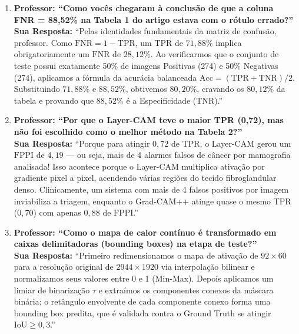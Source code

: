 \documentclass[11pt,a4paper]{article}
\begin{document}
\begin{tcolorbox}[colback=qabg, colframe=qaborder, boxrule=1pt, arc=4pt, title={\bfseries Preparação para Arguição — Parte 3 (Marcos)}]
\begin{enumerate}[leftmargin=*, itemsep=6pt]
    \item \textbf{Professor: ``Como vocês chegaram à conclusão de que a coluna FNR = 88,52\% na Tabela 1 do artigo estava com o rótulo errado?''}\\
    \textbf{Sua Resposta:} ``Pelas identidades fundamentais da matriz de confusão, professor. Como $\text{FNR} = 1 - \text{TPR}$, um $\text{TPR}$ de $71{,}88\%$ implica obrigatoriamente um $\text{FNR}$ de $28{,}12\%$. Ao verificarmos que o conjunto de teste possui exatamente 50\% de imagens Positivas (274) e 50\% Negativas (274), aplicamos a fórmula da acurácia balanceada $\text{Acc} = (\text{TPR} + \text{TNR})/2$. Substituindo $71{,}88\%$ e $88{,}52\%$, obtivemos $80{,}20\%$, cravando os $80{,}12\%$ da tabela e provando que $88{,}52\%$ é a Especificidade (TNR).''

    \item \textbf{Professor: ``Por que o Layer-CAM teve o maior TPR (0,72), mas não foi escolhido como o melhor método na Tabela 2?''}\\
    \textbf{Sua Resposta:} ``Porque para atingir $0{,}72$ de TPR, o Layer-CAM gerou um $\text{FPPI}$ de $4{,}19$ — ou seja, mais de 4 alarmes falsos de câncer por mamografia analisada! Isso acontece porque o Layer-CAM multiplica ativação por gradiente pixel a pixel, acendendo várias regiões do tecido fibroglandular denso. Clinicamente, um sistema com mais de 4 falsos positivos por imagem inviabiliza a triagem, enquanto o Grad-CAM++ atinge quase o mesmo TPR ($0{,}70$) com apenas $0{,}88$ de FPPI.''

    \item \textbf{Professor: ``Como o mapa de calor contínuo é transformado em caixas delimitadoras (bounding boxes) na etapa de teste?''}\\
    \textbf{Sua Resposta:} ``Primeiro redimensionamos o mapa de ativação de $92 \times 60$ para a resolução original de $2944 \times 1920$ via interpolação bilinear e normalizamos seus valores entre 0 e 1 (Min-Max). Depois aplicamos um limiar de binarização $\tau$ e extraímos os componentes conexos da máscara binária; o retângulo envolvente de cada componente conexo forma uma bounding box predita, que é validada contra o Ground Truth se atingir $\text{IoU} \ge 0{,}3$.''
\end{enumerate}
\end{tcolorbox}
\end{document}
